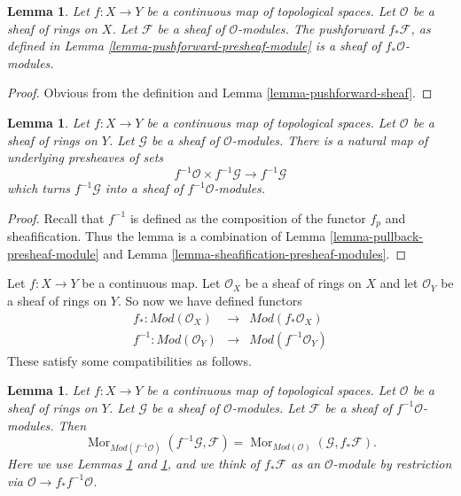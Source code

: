 \documentclass{stacks-project}
\theoremstyle{plain}
\newtheorem{lemma}[subsection]{Lemma}
\theoremstyle{definition}
\theoremstyle{remark}
\numberwithin{equation}{subsection}
\def\Mor{\mathop{\mathrm{Mor}}\nolimits}
\begin{document}
\begin{lemma}
\label{lemma-pushforward-module}
Let $f : X \to Y$ be a continuous map of topological spaces.
Let $\mathcal{O}$ be a sheaf of rings on $X$. Let
$\mathcal{F}$ be a sheaf of $\mathcal{O}$-modules.
The pushforward $f_*\mathcal{F}$, as defined in
Lemma \ref{lemma-pushforward-presheaf-module}
is a sheaf of $f_*\mathcal{O}$-modules.
\end{lemma}

\begin{proof}
Obvious from the definition and Lemma \ref{lemma-pushforward-sheaf}.
\end{proof}

\begin{lemma}
\label{lemma-pullback-module}
Let $f : X \to Y$ be a continuous map of topological spaces.
Let $\mathcal{O}$ be a sheaf of rings on $Y$. Let
$\mathcal{G}$ be a sheaf of $\mathcal{O}$-modules.
There is a natural map of underlying presheaves of sets
$$
f^{-1}\mathcal{O} \times f^{-1}\mathcal{G}
\longrightarrow
f^{-1}\mathcal{G}
$$
which turns $f^{-1}\mathcal{G}$ into a
sheaf of $f^{-1}\mathcal{O}$-modules.
\end{lemma}

\begin{proof}
Recall that $f^{-1}$ is defined as the composition of the
functor $f_p$ and sheafification. Thus the lemma
is a combination of Lemma \ref{lemma-pullback-presheaf-module}
and Lemma \ref{lemma-sheafification-presheaf-modules}.
\end{proof}

\noindent
Let $f : X \to Y$ be a continuous map.
Let $\mathcal{O}_X$ be a sheaf of rings on $X$ and
let $\mathcal{O}_Y$ be a sheaf of rings on $Y$.
So now we have defined functors
\begin{eqnarray*}
f_* : \textit{Mod}(\mathcal{O}_X) &
\longrightarrow &
\textit{Mod}(f_*\mathcal{O}_X) \\
f^{-1} : \textit{Mod}(\mathcal{O}_Y) &
\longrightarrow &
\textit{Mod}(f^{-1}\mathcal{O}_Y)
\end{eqnarray*}
These satisfy some compatibilities as follows.

\begin{lemma}
\label{lemma-adjoint-push-pull-modules}
Let $f : X \to Y$ be a continuous map of topological spaces.
Let $\mathcal{O}$ be a sheaf of rings on $Y$.
Let $\mathcal{G}$ be a sheaf of $\mathcal{O}$-modules.
Let $\mathcal{F}$ be a sheaf of $f^{-1}\mathcal{O}$-modules.
Then
$$
\Mor_{\textit{Mod}(f^{-1}\mathcal{O})}(f^{-1}\mathcal{G}, \mathcal{F})
=
\Mor_{\textit{Mod}(\mathcal{O})}(\mathcal{G}, f_*\mathcal{F}).
$$
Here we use
Lemmas \ref{lemma-pullback-module}
and \ref{lemma-pushforward-module}, and we think of
$f_*\mathcal{F}$ as an $\mathcal{O}$-module by restriction via
$\mathcal{O} \to f_*f^{-1}\mathcal{O}$.
\end{lemma}
\end{document}
